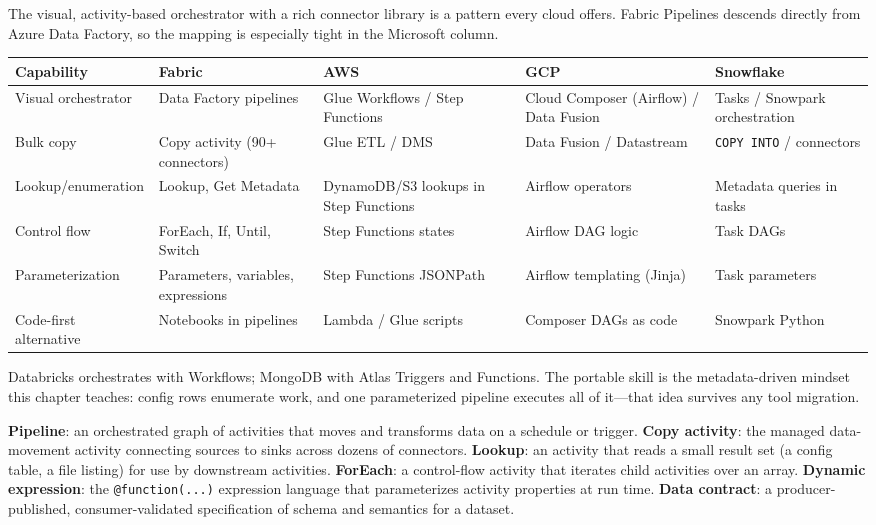 \begin{crosscloud}
The visual, activity-based orchestrator with a rich connector library is a pattern every cloud offers. Fabric Pipelines descends directly from Azure Data Factory, so the mapping is especially tight in the Microsoft column.

\vspace{2mm}
{\footnotesize
\begin{tabular}{@{}p{2.8cm}p{3.2cm}p{3.2cm}p{3.2cm}p{3.2cm}@{}}
\toprule
\textbf{Capability} & \textbf{Fabric} & \textbf{AWS} & \textbf{GCP} & \textbf{Snowflake} \\
\midrule
Visual orchestrator & Data Factory pipelines & Glue Workflows / Step Functions & Cloud Composer (Airflow) / Data Fusion & Tasks / Snowpark orchestration \\
Bulk copy & Copy activity (90+ connectors) & Glue ETL / DMS & Data Fusion / Datastream & \texttt{COPY INTO} / connectors \\
Lookup/enumeration & Lookup, Get Metadata & DynamoDB/S3 lookups in Step Functions & Airflow operators & Metadata queries in tasks \\
Control flow & ForEach, If, Until, Switch & Step Functions states & Airflow DAG logic & Task DAGs \\
Parameterization & Parameters, variables, expressions & Step Functions JSONPath & Airflow templating (Jinja) & Task parameters \\
Code-first alternative & Notebooks in pipelines & Lambda / Glue scripts & Composer DAGs as code & Snowpark Python \\
\bottomrule
\end{tabular}}

\vspace{1mm}
Databricks orchestrates with Workflows; MongoDB with Atlas Triggers and Functions. The portable skill is the metadata-driven mindset this chapter teaches: config rows enumerate work, and one parameterized pipeline executes all of it---that idea survives any tool migration.
\end{crosscloud}

\begin{keyterms}
\textbf{Pipeline}: an orchestrated graph of activities that moves and transforms data on a schedule or trigger. \quad
\textbf{Copy activity}: the managed data-movement activity connecting sources to sinks across dozens of connectors. \quad
\textbf{Lookup}: an activity that reads a small result set (a config table, a file listing) for use by downstream activities. \quad
\textbf{ForEach}: a control-flow activity that iterates child activities over an array. \quad
\textbf{Dynamic expression}: the \texttt{@function(...)} expression language that parameterizes activity properties at run time. \quad
\textbf{Data contract}: a producer-published, consumer-validated specification of schema and semantics for a dataset.
\end{keyterms}

